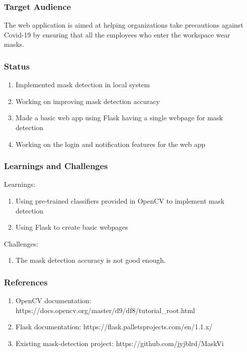 \documentclass[14pt]{beamer}
\begin{document}
\begin{frame}
    \frametitle{Target Audience}
    The web application is  aimed at helping organizations take precautions against Covid-19 by ensuring that all the employees who enter the workspace wear masks.
\end{frame}

\begin{frame}
    \frametitle{Status}
    \begin{enumerate}
        \item Implemented mask detection in local system
        \item Working on improving mask detection accuracy
        \item Made a basic web app using Flask having a single webpage for mask detection
        \item Working on the login and notification features for the web app
    \end{enumerate}
\end{frame}

\begin{frame}
    \frametitle{Learnings and Challenges}
    Learnings:
    \begin{enumerate}
        \item Using pre-trained classifiers provided in OpenCV to implement mask detection
        \item Using Flask to create basic webpages
    \end{enumerate}
    Challenges:
    \begin{enumerate}
        \item The mask detection accuracy is not good enough.
    \end{enumerate}
\end{frame}

\begin{frame}
    \frametitle{References}
    \begin{enumerate}
        \item OpenCV documentation: https://docs.opencv.org/master/d9/df8/tutorial_root.html
        \item Flask documentation: https://flask.palletsprojects.com/en/1.1.x/
        \item Existing mask-detection project: https://github.com/jyjblrd/MaskVi
    \end{enumerate}
\end{frame}
\end{document}
